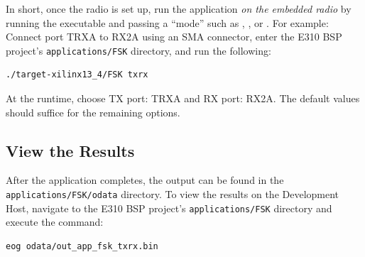 \begin{flushleft}
In short, once the radio is set up, run the application \textit{on the embedded radio} by running the executable and passing a ``mode'' such as , ,  or . For example:\\\medskip
Connect port TRXA to RX2A using an SMA connector, enter the E310 BSP project's \texttt{applications/FSK} directory, and run the following:\\
\begin{verbatim}
./target-xilinx13_4/FSK txrx
\end{verbatim}
At the runtime, choose TX port: TRXA and RX port: RX2A. The default values should suffice for the remaining options.
\subsection{View the Results}
After the application completes, the output can be found in the \texttt{applications/FSK/odata} directory. To view the results on the Development Host, navigate to the E310 BSP project's \texttt{applications/FSK} directory and execute the command:
\begin{verbatim}
eog odata/out_app_fsk_txrx.bin
\end{verbatim}
\end{flushleft}
